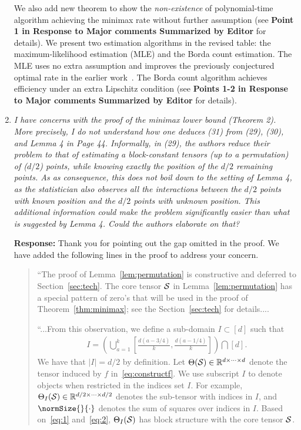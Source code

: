 \documentclass[11pt]{article}
\theoremstyle{plain}
\theoremstyle{definition}
\begin{document}
\begin{enumerate}[wide, labelwidth=!, labelindent=0pt]
    
    We also add new theorem to show the \emph{non-existence} of polynomial-time algorithm achieving the minimax rate without further assumption (see \textbf{Point 1 in Response to Major comments Summarized by Editor} for details). We present two estimation algorithms in the revised table: the maximum-likelihood estimation (MLE) and the Borda count estimation. The MLE uses no extra assumption and improves the previously conjectured optimal rate in the earlier work~\citep{balasubramanian2021nonparametric}. The Borda count algorithm achieves efficiency under an extra Lipschitz condition (see \textbf{Points 1-2 in Response to Major comments Summarized by Editor} for details). 
    
        
    \item \textit{I have concerns with the proof of the minimax lower bound (Theorem 2). More precisely, I do not understand how one deduces (31) from (29), (30), and Lemma 4 in Page 44. Informally, in (29), the authors reduce their problem to that of estimating a block-constant tensors (up to a permutation) of ($d/2$) points, while knowing exactly the position of the $d/2$ remaining points. As as consequence, this does not boil down to the setting of Lemma 4, as the statistician also observes all the interactions between the $d/2$ points with known position and the $d/2$ points with unknown position. This additional information could make the problem significantly easier than what is suggested by Lemma 4. Could the authors elaborate on that?}
    
     \textbf{Response:} Thank you for pointing out the gap omitted in the proof. We have added the following lines in the proof to address your concern.
     \begin{quote}
``The proof of Lemma~\ref{lem:permutation} is constructive and deferred to Section~\ref{sec:tech}. {\color{blue}The core tensor $\mathcal{S}$ in Lemma~\ref{lem:permutation} has a special pattern of zero's that will be used in the proof of Theorem~\ref{thm:minimax}; see the Section~\ref{sec:tech} for details....}

``...From this observation, we define a sub-domain $I\subset [d]$ such that
\begin{align}\label{eq:2}
    I = \left(\bigcup_{a=1}^k\left[\frac{d(a-3/4)}{k},\frac{d(a-1/4)}{k}\right]\right)\bigcap [d].
\end{align}
We have that $|I|=d/2$ by definition. Let $\Theta(\mathcal{S})\in\mathbb{R}^{d\times \cdots \times d}$ denote the tensor induced by $f$ in~\eqref{eq:constructf}. We use subscript $I$ to denote objects when restricted in the indices set $I$. For example, $\Theta_I(\mathcal{S})\in\mathbb{R}^{d/2 \times \cdots \times d/2}$ denotes the sub-tensor with indices in $I$, and $\normSize{}{\cdot}$ denotes the sum of squares over indices in $I$. Based on~\eqref{eq:1} and~\eqref{eq:2}, $\Theta_I(\mathcal{S})$ has block structure with the core tensor $\mathcal{S}$. 


\end{quote}
\end{enumerate}
\end{document}
